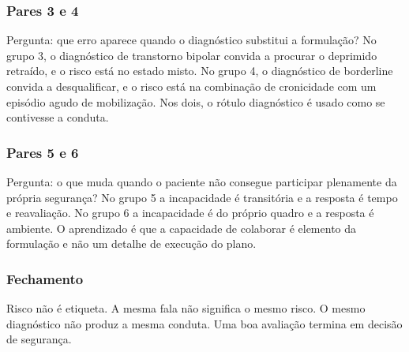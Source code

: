 \subsubsection*{Pares 3 e 4}

Pergunta: que erro aparece quando o diagnóstico substitui a formulação? No grupo 3, o diagnóstico de transtorno bipolar convida a procurar o deprimido retraído, e o risco está no estado misto. No grupo 4, o diagnóstico de borderline convida a desqualificar, e o risco está na combinação de cronicidade com um episódio agudo de mobilização. Nos dois, o rótulo diagnóstico é usado como se contivesse a conduta.

\subsubsection*{Pares 5 e 6}

Pergunta: o que muda quando o paciente não consegue participar plenamente da própria segurança? No grupo 5 a incapacidade é transitória e a resposta é tempo e reavaliação. No grupo 6 a incapacidade é do próprio quadro e a resposta é ambiente. O aprendizado é que a capacidade de colaborar é elemento da formulação e não um detalhe de execução do plano.

\subsubsection*{Fechamento}

Risco não é etiqueta. A mesma fala não significa o mesmo risco. O mesmo diagnóstico não produz a mesma conduta. Uma boa avaliação termina em decisão de segurança.
